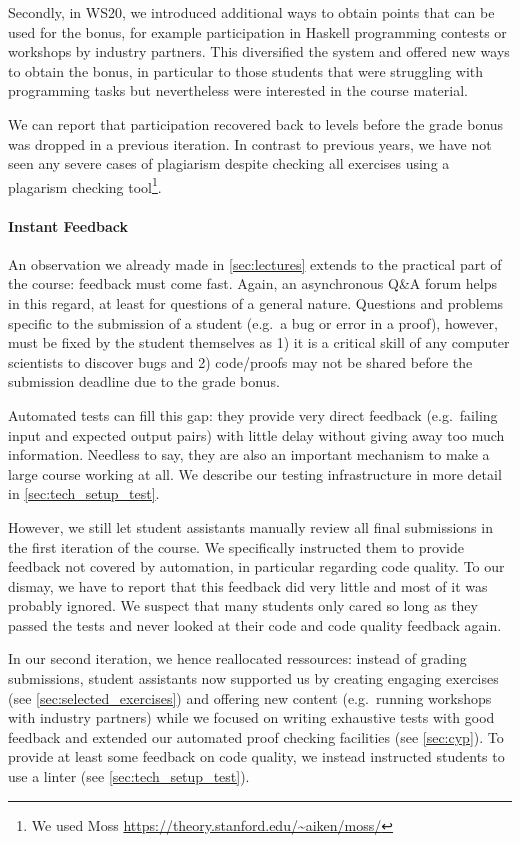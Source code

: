 Secondly, in WS20, we introduced additional ways to
obtain points that can be used for the bonus,
for example participation in Haskell programming contests or workshops by industry partners.
This diversified the system and offered new ways
to obtain the bonus,
in particular to those students that were struggling
with programming tasks but nevertheless were interested in the course material.

We can report that participation recovered
back to levels before the grade bonus was dropped in a previous iteration.
In contrast to previous years,
we have not seen any severe cases of plagiarism despite
checking all exercises using a plagarism checking tool\footnote{We used Moss \url{https://theory.stanford.edu/~aiken/moss/}}.

\paragraph{Instant Feedback}
An observation we already made in \cref{sec:lectures}
extends to the practical part of the course:
feedback must come fast.
Again, an asynchronous Q\&A forum helps in this regard,
at least for questions of a general nature.
Questions and problems specific to the submission of a student (e.g.\ a bug or error in a proof),
however, must be fixed by the student themselves as 1) it is a critical skill of any computer scientists to discover bugs and 2) code/proofs may not be shared before the submission deadline due to the grade bonus.

Automated tests can fill this gap:
they provide very direct feedback (e.g.\ failing input and expected output pairs) with little delay
without giving away too much information.
Needless to say, they are also an important mechanism
to make a large course working at all.
We describe our testing infrastructure in more detail in \cref{sec:tech_setup_test}.

However, we still let student assistants manually review all final submissions
in the first iteration of the course.
We specifically instructed them to provide feedback not covered by automation,
in particular regarding code quality.
To our dismay, we have to report that this feedback did very little and
most of it was probably ignored.
We suspect that many students only cared so long as they passed the tests
and never looked at their code and code quality feedback again.

In our second iteration, we hence reallocated ressources:
instead of grading submissions,
student assistants now supported us by creating engaging exercises
(see \cref{sec:selected_exercises})
and offering new content (e.g.\ running workshops with industry partners)
while we focused on writing exhaustive tests with good feedback and extended our automated proof checking facilities (see \cref{sec:cyp}).
To provide at least some feedback on
code quality, we instead instructed students
to use a linter (see \cref{sec:tech_setup_test}).

